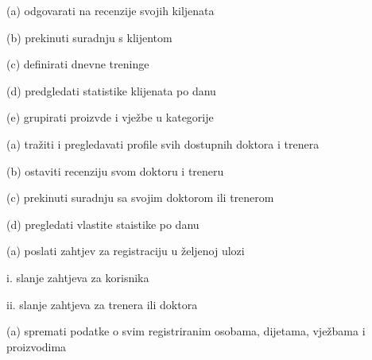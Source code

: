 \begin{packed_enum}
				\begin{packed_enum}
					
					\item (a) odgovarati na recenzije svojih kiljenata
					\item (b) prekinuti suradnju s klijentom
					\item (c) definirati dnevne treninge
					\item (d) predgledati statistike klijenata po danu
					\item (e) grupirati proizvde i vježbe u kategorije
					
				\end{packed_enum}
			
				\item  {}
				
				\begin{packed_enum}
					
					\item (a) tražiti i pregledavati profile svih dostupnih doktora i trenera
					\item (b) ostaviti recenziju svom doktoru i treneru
					\item (c) prekinuti suradnju sa svojim doktorom ili trenerom
					\item (d) pregledati vlastite staistike po danu
					
				\end{packed_enum}
			
				\item  {}
				
				\begin{packed_enum}
					
					\item (a) poslati zahtjev za registraciju u željenoj ulozi
					
					\begin{packed_enum}
						
						\item i. slanje zahtjeva za korisnika 
						\item ii. slanje zahtjeva za trenera ili doktora
						
					\end{packed_enum}
					
				\end{packed_enum}
			
				\item  \underbar{Baza podataka može:}
				
				\begin{packed_enum}
					
					\item (a) spremati podatke o svim registriranim osobama, dijetama, vježbama i proizvodima
					
				\end{packed_enum}
			
			\end{packed_enum}
			
